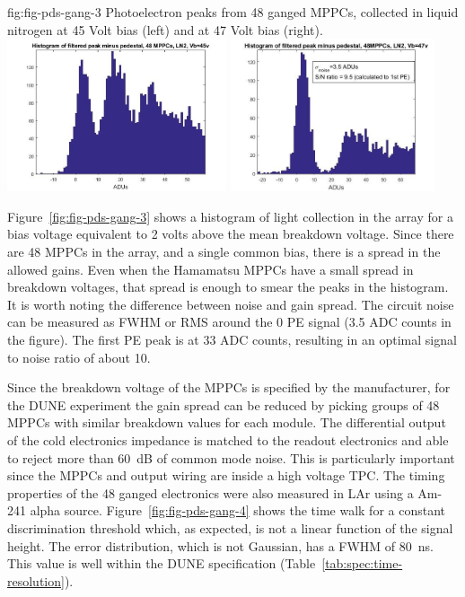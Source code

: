 \begin{dunefigure}
 {fig:fig-pds-gang-3}
 {Photoelectron peaks from 48 ganged MPPCs, collected in liquid nitrogen at 45 Volt bias (left) and at 47 Volt bias (right).}
\includegraphics[height=4.5cm]{graphics/pds_gang_fig4.jpg}
\includegraphics[height=4.5cm]{graphics/pds_gang_fig5.jpg}
\end{dunefigure}

Figure~\ref{fig:fig-pds-gang-3} shows a histogram of light collection in the array for a bias voltage equivalent to 2 volts above the mean breakdown voltage. Since there are 48 MPPCs in the array, and a single common bias, there is a spread in the allowed gains. Even when the Hamamatsu MPPCs have a small spread in breakdown voltages, that spread is enough to smear the peaks in the histogram. It is worth noting the difference between noise and gain spread. The circuit noise can be measured as FWHM or RMS around the 0 PE signal (3.5 ADC counts in the figure). The first PE peak is at 33 ADC counts, resulting in an optimal signal to noise ratio of about 10.

Since the breakdown voltage of the MPPCs is specified by the manufacturer, for the DUNE experiment the gain spread can be reduced by picking groups of 48 MPPCs with similar breakdown values for each module. The differential output of the cold electronics impedance is matched to the readout electronics and able to reject more than \SI{60}{dB} of common mode noise. This is particularly important since the MPPCs and output wiring are inside a high voltage TPC. The timing properties of the 48 ganged electronics were also measured 
in LAr using a Am-241 alpha source. 
Figure~\ref{fig:fig-pds-gang-4} shows the time walk for a constant discrimination threshold which, 
as expected, is not a linear function of the signal height. The error distribution, which is not Gaussian, has a FWHM of \SI{80}{ns}. This value is well within the DUNE specification (Table~\ref{tab:spec:time-resolution}).

